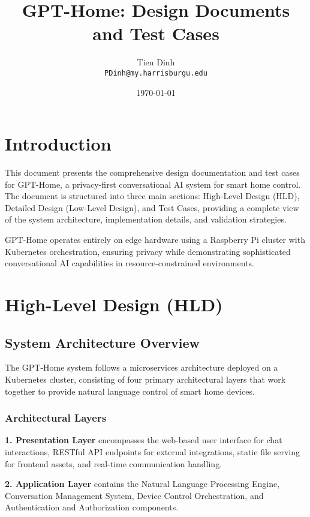 \documentclass[12pt]{article}
\title{GPT-Home: Design Documents and Test Cases}
\author{Tien Dinh\\\texttt{PDinh@my.harrisburgu.edu}}
\date{\today}
\begin{document}
\maketitle

\section{Introduction}

This document presents the comprehensive design documentation and test cases for GPT-Home, a privacy-first conversational AI system for smart home control. The document is structured into three main sections: High-Level Design (HLD), Detailed Design (Low-Level Design), and Test Cases, providing a complete view of the system architecture, implementation details, and validation strategies.

GPT-Home operates entirely on edge hardware using a Raspberry Pi cluster with Kubernetes orchestration, ensuring privacy while demonstrating sophisticated conversational AI capabilities in resource-constrained environments.

\section{High-Level Design (HLD)}

\subsection{System Architecture Overview}

The GPT-Home system follows a microservices architecture deployed on a Kubernetes cluster, consisting of four primary architectural layers that work together to provide natural language control of smart home devices.

\subsubsection{Architectural Layers}

\textbf{1. Presentation Layer} encompasses the web-based user interface for chat interactions, RESTful API endpoints for external integrations, static file serving for frontend assets, and real-time communication handling.

\textbf{2. Application Layer} contains the Natural Language Processing Engine, Conversation Management System, Device Control Orchestration, and Authentication and Authorization components.
\end{document}
